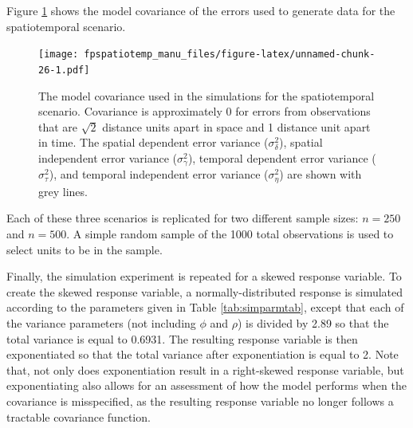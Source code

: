 \documentclass[]{interact}
\theoremstyle{plain}%
\theoremstyle{definition}
\theoremstyle{remark}
\begin{document}
Figure \ref{fig:simcovplot} shows the model covariance of the errors
used to generate data for the spatiotemporal scenario.

\begin{figure}
\centering
\texttt{[image: fpspatiotemp\_manu\_files/figure-latex/unnamed-chunk-26-1.pdf]}
\caption{\label{fig:simcovplot} The model covariance used in the
simulations for the spatiotemporal scenario. Covariance is approximately
0 for errors from observations that are \(\sqrt2\) distance units apart
in space and 1 distance unit apart in time. The spatial dependent error
variance (\(\sigma^2_{\delta}\)), spatial independent error variance
(\(\sigma^2_{\gamma}\)), temporal dependent error variance
(\(\sigma^2_{\tau}\)), and temporal independent error variance
(\(\sigma^2_{\eta}\)) are shown with grey lines.}
\end{figure}

Each of these three scenarios is replicated for two different sample
sizes: \(n = 250\) and \(n = 500\). A simple random sample of the 1000
total observations is used to select units to be in the sample.

Finally, the simulation experiment is repeated for a skewed response
variable. To create the skewed response variable, a normally-distributed
response is simulated according to the parameters given in Table
\ref{tab:simparmtab}, except that each of the variance parameters (not
including \(\phi\) and \(\rho\)) is divided by 2.89 so that the total
variance is equal to 0.6931. The resulting response variable is then
exponentiated so that the total variance after exponentiation is equal
to 2. Note that, not only does exponentiation result in a right-skewed
response variable, but exponentiating also allows for an assessment of
how the model performs when the covariance is misspecified, as the
resulting response variable no longer follows a tractable covariance
function.
\end{document}
